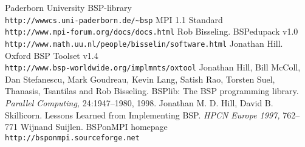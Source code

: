\documentclass[a4paper]{article}
\begin{document}
\begin{thebibliography}{1}
 Paderborn University BSP-library\\
             \verb|http://wwwcs.uni-paderborn.de/~bsp|
 MPI 1.1 Standard \\
            \verb|http://www.mpi-forum.org/docs/docs.html|
 Rob Bisseling. BSPedupack v1.0 \\
        \verb|http://www.math.uu.nl/people/bisselin/software.html|
 Jonathan Hill. Oxford BSP Toolset v1.4 \\
        \verb|http://www.bsp-worldwide.org/implmnts/oxtool|
 Jonathan Hill, Bill McColl, Dan Stefanescu, Mark Goudreau,
Kevin Lang, Satish Rao, Torsten Suel, Thanasis, Tsantilas and Rob Bisseling.
BSPlib: The BSP programming library. \textit{Parallel Computing,}
24:1947--1980, 1998.
 Jonathan M. D. Hill, David B. Skillicorn.
Lessons Learned from Implementing BSP. \textit{HPCN Europe 1997,} 762--771
 Wijnand Suijlen. BSPonMPI homepage\\
        \verb|http://bsponmpi.sourceforge.net|
\end{thebibliography}
\end{document}
